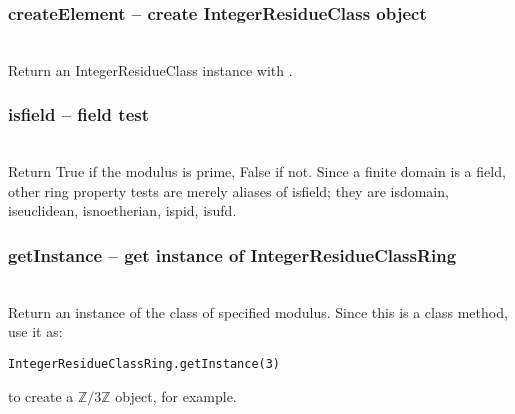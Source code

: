  \subsubsection{createElement -- create IntegerResidueClass object}
   \\
   \spacing
   \quad Return an IntegerResidueClass instance with . 
%
  \subsubsection{isfield -- field test}
   \\
   \spacing
   \quad Return True if the modulus is prime, False if not. Since a finite domain is a field, other ring property tests are merely aliases of isfield; they are isdomain, iseuclidean, isnoetherian, ispid, isufd.
%
  \subsubsection{getInstance -- get instance of IntegerResidueClassRing}
   \\
   \spacing
   \quad Return an instance of the class of specified modulus. Since this is a class method, use it as:

\verb|IntegerResidueClassRing.getInstance(3)|

to create a $\mathbb{Z}/3\mathbb{Z}$ object, for example.

\C



